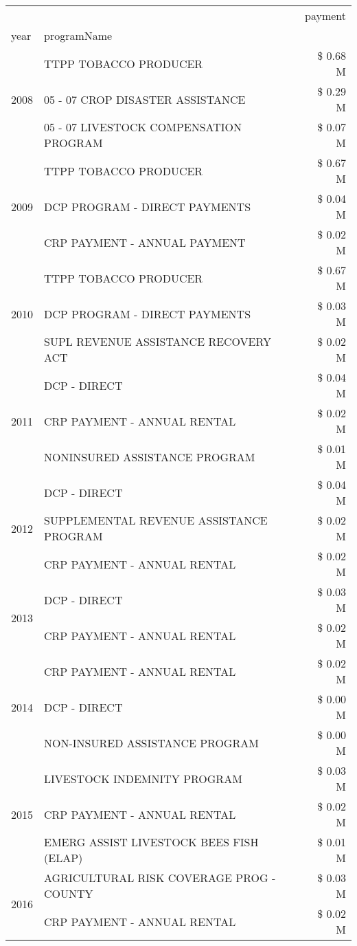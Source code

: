 \begin{tabular}{llr}
\toprule
 &  & payment \\
year & programName &  \\
\midrule
\multirow[t]{3}{*}{2008} & TTPP TOBACCO PRODUCER & \$ 0.68 M \\
 & 05 - 07 CROP DISASTER ASSISTANCE & \$ 0.29 M \\
 & 05 - 07 LIVESTOCK COMPENSATION PROGRAM & \$ 0.07 M \\
\cline{1-3}
\multirow[t]{3}{*}{2009} & TTPP TOBACCO PRODUCER & \$ 0.67 M \\
 & DCP PROGRAM - DIRECT PAYMENTS & \$ 0.04 M \\
 & CRP PAYMENT - ANNUAL PAYMENT & \$ 0.02 M \\
\cline{1-3}
\multirow[t]{3}{*}{2010} & TTPP TOBACCO PRODUCER & \$ 0.67 M \\
 & DCP PROGRAM - DIRECT PAYMENTS & \$ 0.03 M \\
 & SUPL REVENUE ASSISTANCE RECOVERY ACT & \$ 0.02 M \\
\cline{1-3}
\multirow[t]{3}{*}{2011} & DCP - DIRECT & \$ 0.04 M \\
 & CRP PAYMENT - ANNUAL RENTAL & \$ 0.02 M \\
 & NONINSURED ASSISTANCE PROGRAM & \$ 0.01 M \\
\cline{1-3}
\multirow[t]{3}{*}{2012} & DCP - DIRECT & \$ 0.04 M \\
 & SUPPLEMENTAL REVENUE ASSISTANCE PROGRAM & \$ 0.02 M \\
 & CRP PAYMENT - ANNUAL RENTAL & \$ 0.02 M \\
\cline{1-3}
\multirow[t]{2}{*}{2013} & DCP - DIRECT & \$ 0.03 M \\
 & CRP PAYMENT - ANNUAL RENTAL & \$ 0.02 M \\
\cline{1-3}
\multirow[t]{3}{*}{2014} & CRP PAYMENT - ANNUAL RENTAL & \$ 0.02 M \\
 & DCP - DIRECT & \$ 0.00 M \\
 & NON-INSURED ASSISTANCE PROGRAM & \$ 0.00 M \\
\cline{1-3}
\multirow[t]{3}{*}{2015} & LIVESTOCK INDEMNITY PROGRAM & \$ 0.03 M \\
 & CRP PAYMENT - ANNUAL RENTAL & \$ 0.02 M \\
 & EMERG ASSIST LIVESTOCK BEES FISH (ELAP) & \$ 0.01 M \\
\cline{1-3}
\multirow[t]{3}{*}{2016} & AGRICULTURAL RISK COVERAGE PROG - COUNTY & \$ 0.03 M \\
 & CRP PAYMENT - ANNUAL RENTAL & \$ 0.02 M \\

\end{tabular}
